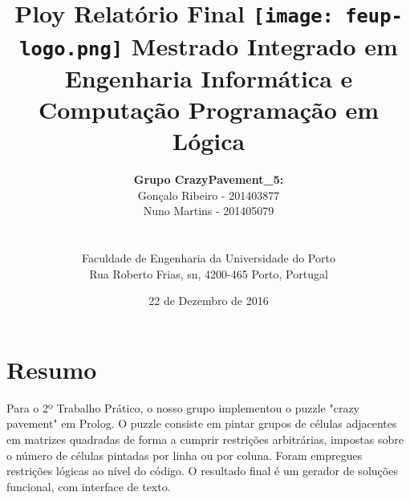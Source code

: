 \documentclass[a4paper]{article}
\begin{document}
\setlength{\textwidth}{16cm}
\setlength{\textheight}{22cm}

\title{\Huge\textbf{Ploy}\linebreak\linebreak\linebreak
\Large\textbf{Relatório Final}\linebreak\linebreak
\linebreak\linebreak
\texttt{[image: feup-logo.png]}\linebreak\linebreak
\linebreak\linebreak
\Large{Mestrado Integrado em Engenharia Informática e Computação} \linebreak\linebreak
\Large{Programação em Lógica}\linebreak
}

\author{\textbf{Grupo CrazyPavement\_5:}\\ Gonçalo Ribeiro - 201403877 \\ Nuno Martins - 201405079 \\\linebreak\linebreak \\
 \\ Faculdade de Engenharia da Universidade do Porto \\ Rua Roberto Frias, s\/n, 4200-465 Porto, Portugal \linebreak\linebreak\linebreak
\linebreak\linebreak\vspace{1cm}}
\date{22 de Dezembro de 2016}
\maketitle
\thispagestyle{empty}


\newpage

\section*{Resumo}
Para o 2º Trabalho Prático, o nosso grupo implementou o puzzle "crazy pavement" em Prolog. O puzzle consiste em pintar grupos de células adjacentes em matrizes quadradas de forma a cumprir restrições arbitrárias, impostas sobre o número de células pintadas por linha ou por coluna. Foram empregues restrições lógicas ao nível do código. O resultado final é um gerador de soluções funcional, com interface de texto.
\end{document}

